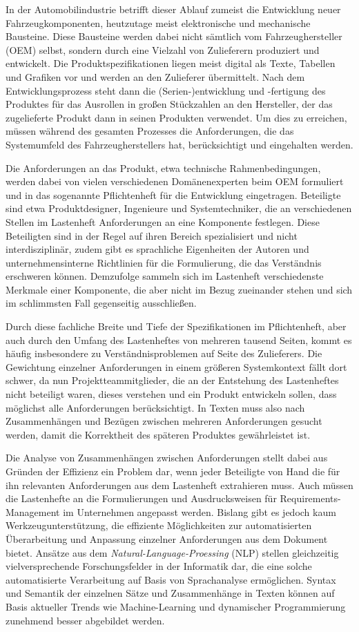 \documentclass[12pt]{report}
\begin{document}
In der Automobilindustrie betrifft dieser Ablauf zumeist die Entwicklung neuer Fahrzeugkomponenten, heutzutage meist elektronische und mechanische Bausteine. Diese Bausteine werden dabei nicht sämtlich vom Fahrzeughersteller (OEM) selbst, sondern durch eine Vielzahl von Zulieferern produziert und entwickelt. Die Produktspezifikationen liegen meist digital als Texte, Tabellen und Grafiken vor und werden an den Zulieferer übermittelt.
Nach dem Entwicklungsprozess steht dann die (Serien-)entwicklung und -fertigung des Produktes für das Ausrollen in großen Stückzahlen an den Hersteller, der das zugelieferte Produkt dann in seinen Produkten verwendet. Um dies zu erreichen, müssen während des gesamten Prozesses die Anforderungen, die das Systemumfeld des  Fahrzeugherstellers hat, berücksichtigt und eingehalten werden.

Die Anforderungen an das Produkt, etwa technische Rahmenbedingungen, werden dabei von vielen verschiedenen Domänenexperten beim OEM formuliert und in das sogenannte Pflichtenheft für die Entwicklung eingetragen. Beteiligte sind etwa Produktdesigner, Ingenieure und Systemtechniker, die an verschiedenen Stellen im Lastenheft Anforderungen an eine Komponente festlegen. Diese Beteiligten sind in der Regel auf ihren Bereich spezialisiert und nicht interdisziplinär, zudem gibt es sprachliche Eigenheiten der Autoren und unternehmensinterne Richtlinien für die Formulierung, die das Verständnis erschweren können. Demzufolge sammeln sich im Lastenheft verschiedenste Merkmale einer Komponente, die aber nicht im Bezug zueinander stehen und sich im schlimmsten Fall gegenseitig ausschließen. 

Durch diese fachliche Breite und Tiefe der Spezifikationen im Pflichtenheft, aber auch durch den Umfang des Lastenheftes von mehreren tausend Seiten, kommt es häufig insbesondere zu Verständnisproblemen auf Seite des Zulieferers. Die Gewichtung einzelner Anforderungen in einem größeren Systemkontext fällt dort schwer, da nun Projektteammitglieder, die an der Entstehung des Lastenheftes nicht beteiligt waren, dieses verstehen und ein Produkt entwickeln sollen, dass möglichst alle Anforderungen berücksichtigt. In Texten muss also nach Zusammenhängen und Bezügen zwischen mehreren Anforderungen gesucht werden, damit die Korrektheit des späteren Produktes gewährleistet ist.

Die Analyse von Zusammenhängen zwischen Anforderungen stellt dabei aus Gründen der Effizienz ein Problem dar, wenn jeder Beteiligte von Hand die für ihn relevanten Anforderungen aus dem Lastenheft extrahieren muss. Auch müssen die Lastenhefte an die Formulierungen und Ausdrucksweisen für Requirements-Management im Unternehmen angepasst werden. Bislang gibt es jedoch kaum Werkzeugunterstützung, die effiziente Möglichkeiten zur automatisierten Überarbeitung und Anpassung einzelner Anforderungen aus dem Dokument bietet. Ansätze aus dem \textit{Natural-Language-Proessing} (NLP) stellen gleichzeitig vielversprechende Forschungsfelder in der Informatik dar, die eine solche automatisierte Verarbeitung auf Basis von Sprachanalyse ermöglichen. Syntax und Semantik der einzelnen Sätze und Zusammenhänge in Texten können auf Basis aktueller Trends wie Machine-Learning und dynamischer Programmierung zunehmend besser abgebildet werden.
\end{document}
